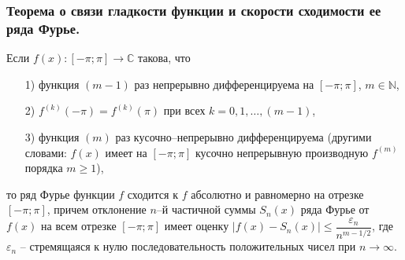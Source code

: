 \subsubsection{Теорема о связи гладкости функции и скорости сходимости ее ряда Фурье.}
\begin{theorem*} Если $f(x): \left[-\pi; \pi\right] \to \mathbb{C}$ такова, что
	\begin{itemize}
		\item[1)] функция $(m-1)$ раз непрерывно дифференцируема на $\left[ -\pi; \pi \right]$, $m \in \mathbb{N}$,
		\item[2)] $f^{(k)}(-\pi) = f^{(k)}(\pi)$ при всех $k = 0,1, \dotsc, (m-1)$,
		\item[3)] функция $(m)$ раз кусочно--непрерывно дифференцируема (другими словами: $f(x)\text{ имеет на } \left[ -\pi; \pi \right]$ кусочно непрерывную производную $f^{(m)}$ порядка $m \geqslant 1$),
	\end{itemize}
	то ряд Фурье функции $f$ сходится к $f$ абсолютно и равномерно на отрезке $\left[-\pi; \pi\right]$, причем отклонение $n$--й частичной суммы $S_n(x)$ ряда Фурье от $f(x)$ на всем отрезке $\left[-\pi; \pi\right]$ имеет оценку $|f(x) - S_n(x)| \leqslant \dfrac{\varepsilon_n}{n^{m - 1/2}}$, где ${\varepsilon_n}$ -- стремящаяся к нулю последовательность положительных чисел при $n \to \infty$.
\end{theorem*} 
